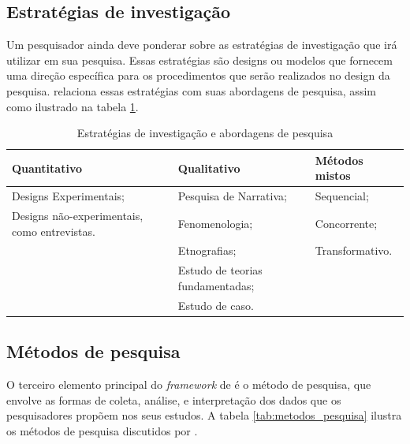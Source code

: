 \subsection{Estratégias de investigação}

Um pesquisador ainda deve ponderar sobre as estratégias de investigação que irá utilizar em sua pesquisa. Essas estratégias são designs ou modelos que fornecem uma direção específica para os procedimentos que serão realizados no design da pesquisa. \cite{creswell_research_2014} relaciona essas estratégias com suas abordagens de pesquisa, assim como ilustrado na tabela \ref{tab:estrategias_investigacao}.

    \begin{center}
        \begin{table}[!htp]
            \caption{Estratégias de investigação e abordagens de pesquisa}
            \label{tab:estrategias_investigacao}
            \begin{tabular}{|p{4.5cm}|p{5cm}|p{5cm}|}
                \hline
                Quantitativo                      & Qualitativo                     & Métodos mistos   \\
                \hline
                Designs Experimentais;              & Pesquisa de Narrativa;          & Sequencial; \\
                Designs não-experimentais, como entrevistas.     & Fenomenologia;       & Concorrente;    \\
                                                  & Etnografias;       & Transformativo.    \\
                                                  & Estudo de teorias fundamentadas;       &     \\
                                                  & Estudo de caso.       &     \\
                \hline
            \end{tabular}
        \end{table}
    \end{center}

\subsection{Métodos de pesquisa}

O terceiro elemento principal do \emph{framework} de \cite{creswell_research_2014} é o método de pesquisa, que envolve as formas de coleta, análise, e interpretação dos dados que os pesquisadores propõem nos seus estudos. A tabela \ref{tab:metodos_pesquisa} ilustra os métodos de pesquisa discutidos por \cite{creswell_research_2014}.

